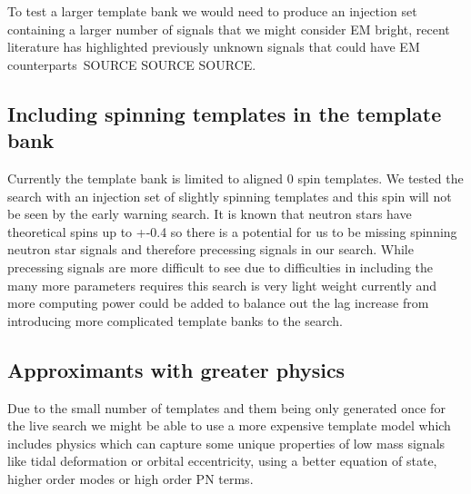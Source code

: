 To test a larger template bank we would need to produce an injection set containing a larger number of signals that we might consider EM bright, recent literature has highlighted previously unknown signals that could have EM counterparts~SOURCE SOURCE SOURCE.

\subsection{Including spinning templates in the template bank}
Currently the template bank is limited to aligned 0 spin templates. We tested the search with an injection set of slightly spinning templates and this spin will not be seen by the early warning search. It is known that neutron stars have theoretical spins up to +-0.4 so there is a potential for us to be missing spinning neutron star signals and therefore precessing signals in our search. While precessing signals are more difficult to see due to difficulties in including the many more parameters requires this search is very light weight currently and more computing power could be added to balance out the lag increase from introducing more complicated template banks to the search.

\subsection{Approximants with greater physics}
Due to the small number of templates and them being only generated once for the live search we might be able to use a more expensive template model which includes physics which can capture some unique properties of low mass signals like tidal deformation or orbital eccentricity, using a better equation of state, higher order modes or high order PN terms.


